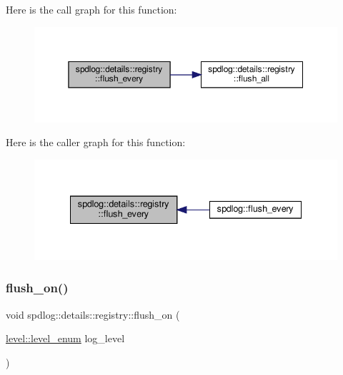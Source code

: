 Here is the call graph for this function\+:
\nopagebreak
\begin{figure}[H]
\begin{center}
\leavevmode
\includegraphics[width=350pt]{classspdlog_1_1details_1_1registry_a78eb75a31640c0bb204d7f2123ba825c_cgraph}
\end{center}
\end{figure}
Here is the caller graph for this function\+:
\nopagebreak
\begin{figure}[H]
\begin{center}
\leavevmode
\includegraphics[width=335pt]{classspdlog_1_1details_1_1registry_a78eb75a31640c0bb204d7f2123ba825c_icgraph}
\end{center}
\end{figure}
\mbox{\label{classspdlog_1_1details_1_1registry_a34841160632afca0f2063f1d55629d73}} 
\subsubsection{\texorpdfstring{flush\+\_\+on()}{flush\_on()}}
{\footnotesize\ttfamily void spdlog\+::details\+::registry\+::flush\+\_\+on (\begin{DoxyParamCaption}\item[{\hyperlink{namespacespdlog_1_1level_a35f5227e5daf228d28a207b7b2aefc8b}{level\+::level\+\_\+enum}}]{log\+\_\+level }\end{DoxyParamCaption})\hspace{0.3cm}{\ttfamily [inline]}}



